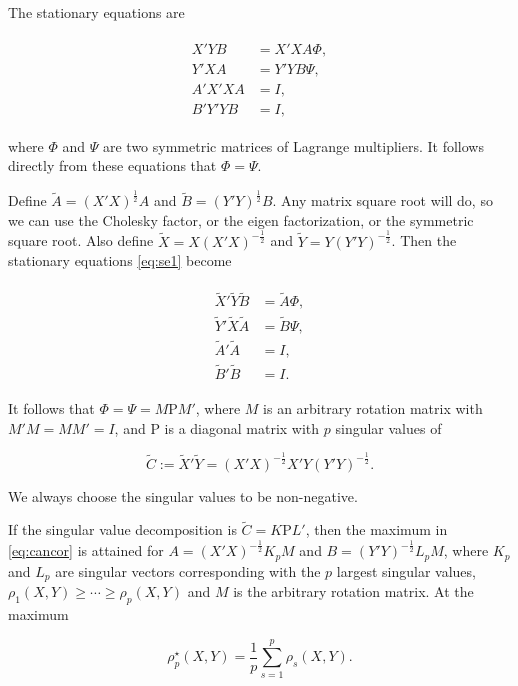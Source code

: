 \documentclass[
  12pt,
]{article}
\begin{document}
The stationary equations are

\begin{align}
\begin{split}
X'YB&=X'XA\Phi,\\
Y'XA&=Y'YB\Psi,\\
A'X'XA&=I,\\
B'Y'YB&=I,
\end{split}
\label{eq:se1}
\end{align}

where \(\Phi\) and \(\Psi\) are two symmetric matrices of Lagrange multipliers. It follows directly from these equations that \(\Phi=\Psi\).

Define \(\tilde A=(X'X)^\frac12 A\) and
\(\tilde B=(Y'Y)^\frac12 B\). Any matrix square root will do, so we can use the Cholesky factor, or the eigen factorization, or the symmetric square root. Also define
\(\tilde X=X(X'X)^{-\frac12}\) and \(\tilde Y=Y(Y'Y)^{-\frac12}\). Then the stationary equations \eqref{eq:se1} become

\begin{align}
\begin{split}
\tilde X'\tilde Y\tilde B&=\tilde A\Phi,\\
\tilde Y'\tilde X\tilde A&=\tilde B\Psi,\\
\tilde A'\tilde A&=I,\\
\tilde B'\tilde B&=I.
\end{split}
\label{eq:se2}
\end{align}

It follows that \(\Phi=\Psi=M\mathrm{P} M'\), where
\(M\) is an arbitrary rotation matrix with \(M'M=MM'=I\), and \(\mathrm{P}\) is a diagonal matrix with \(p\) singular values of

\begin{equation}
\tilde C:=\tilde X'\tilde Y=
(X'X)^{-\frac12}X'Y(Y'Y)^{-\frac12}.
\label{eq:tildec}
\end{equation}

We always choose the singular values to be non-negative.

If the singular value decomposition is
\(\tilde C=K\mathrm{P} L'\), then the maximum in \eqref{eq:cancor}
is attained for \(A=(X'X)^{-\frac12}K_pM\)
and \(B=(Y'Y)^{-\frac12}L_pM\), where \(K_p\)
and \(L_p\) are singular vectors corresponding with the \(p\) largest singular values, \(\rho_1(X,Y)\geq\cdots\geq\rho_p(X,Y)\) and \(M\)
is the arbitrary rotation matrix. At the maximum

\begin{equation}
\rho_p^\star(X,Y)=\frac{1}{p}\sum_{s=1}^p\rho_s(X,Y).
\label{eq:rhomax}
\end{equation}
\end{document}
